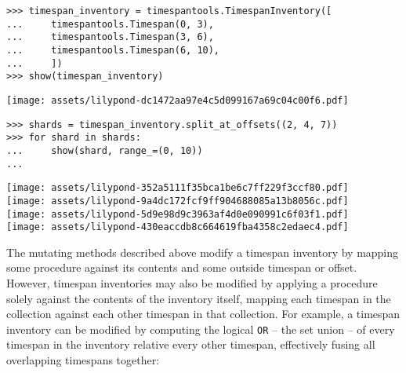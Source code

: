 \begin{singlespacing}
\vspace{-0.5\baselineskip}
\begin{lstlisting}
>>> timespan_inventory = timespantools.TimespanInventory([
...     timespantools.Timespan(0, 3),
...     timespantools.Timespan(3, 6),
...     timespantools.Timespan(6, 10),
...     ])
>>> show(timespan_inventory)
\end{lstlisting}
\noindent\texttt{[image: assets/lilypond-dc1472aa97e4c5d099167a69c04c00f6.pdf]}
\begin{lstlisting}
>>> shards = timespan_inventory.split_at_offsets((2, 4, 7))
>>> for shard in shards:
...     show(shard, range_=(0, 10))
...
\end{lstlisting}
\noindent\texttt{[image: assets/lilypond-352a5111f35bca1be6c7ff229f3ccf80.pdf]}\\
\noindent\texttt{[image: assets/lilypond-9a4dc172fcf9ff904688085a13b8056c.pdf]}\\
\noindent\texttt{[image: assets/lilypond-5d9e98d9c3963af4d0e090991c6f03f1.pdf]}\\
\noindent\texttt{[image: assets/lilypond-430eaccdb8c664619fba4358c2edaec4.pdf]}
\end{singlespacing}

\noindent The mutating methods described above modify a timespan inventory
by mapping some procedure against its contents and some outside timespan or
offset. However, timespan inventories may also be modified by applying a
procedure solely against the contents of the inventory itself, mapping each
timespan in the collection against each other timespan in that collection.
For example, a timespan inventory can be modified by computing the logical
\texttt{OR} -- the set union -- of every timespan in the inventory relative
every other timespan, effectively fusing all overlapping timespans together:

\begin{comment}
<abjad>
timespan_inventory = timespantools.TimespanInventory([
    timespantools.Timespan(-2, 2),
    timespantools.Timespan(0, 10),
    timespantools.Timespan(5, 12),
    ])
show(timespan_inventory)
result = timespan_inventory.compute_logical_or()
print(format(result))
show(result)
</abjad>
\end{comment}


